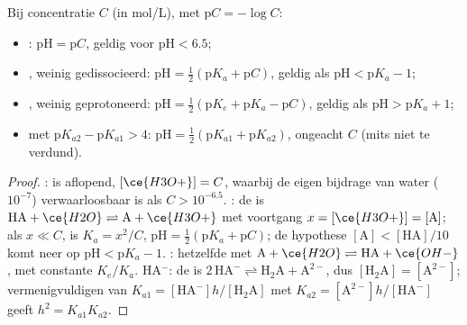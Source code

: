 \begin{proposition}\label{prop:b1:predominant-reaction:ph-formulas}
Bij concentratie $C$ (in \unit{mol/L}), met $\mathrm{p}C = -\log C$:
\begin{itemize}
  \item {}: $\mathrm{pH} = \mathrm{p}C$, geldig voor
        $\mathrm{pH} < 6.5$;
  \item {}, weinig gedissocieerd: $\mathrm{pH} = \frac12(\mathrm{p}K_a
        + \mathrm{p}C)$, geldig als $\mathrm{pH} < \mathrm{p}K_a - 1$;
  \item {}, weinig geprotoneerd: $\mathrm{pH} = \frac12(\mathrm{p}K_e +
        \mathrm{p}K_a - \mathrm{p}C)$, geldig als $\mathrm{pH} > \mathrm{p}K_a +
        1$;
  \item {} met $\mathrm{p}K_{a2} - \mathrm{p}K_{a1} > 4$:
        $\mathrm{pH} = \frac12(\mathrm{p}K_{a1} + \mathrm{p}K_{a2})$,
        ongeacht $C$ (mits niet te verdund).
\end{itemize}
\end{proposition}

\begin{proof}
:  is aflopend, $[\ce{H3O+}] = C$,
waarbij de eigen bijdrage van water ($10^{-7}$) verwaarloosbaar is als
$C > 10^{-6.5}$. : de  is $\mathrm{HA} + \ce{H2O}
\rightleftharpoons \mathrm{A} + \ce{H3O+}$ met voortgang $x = [\ce{H3O+}]
= [\mathrm{A}]$; als $x \ll C$, is $K_a = x^2/C$, $\mathrm{pH} = \frac12(\mathrm{p}K_a
+ \mathrm{p}C)$; de hypothese $[\mathrm{A}] < [\mathrm{HA}]/10$ komt neer op
$\mathrm{pH} < \mathrm{p}K_a - 1$. : hetzelfde met $\mathrm{A} +
\ce{H2O} \rightleftharpoons \mathrm{HA} + \ce{OH-}$, met constante $K_e/K_a$.
 HA$^-$: de  is $2\,\mathrm{HA}^- \rightleftharpoons
\mathrm{H_2A} + \mathrm{A}^{2-}$, dus $[\mathrm{H_2A}] = [\mathrm{A}^{2-}]$;
vermenigvuldigen van $K_{a1} = [\mathrm{HA}^-]h/[\mathrm{H_2A}]$ met $K_{a2} =
[\mathrm{A}^{2-}]h/[\mathrm{HA}^-]$ geeft $h^2 = K_{a1}K_{a2}$.
\end{proof}

